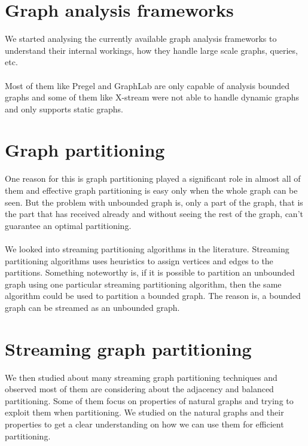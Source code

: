 \documentclass[12pt]{report}
\numberwithin{figure}{section}
\numberwithin{table}{section}
\begin{document}
\section{Graph analysis frameworks}
We started analysing the currently available graph analysis frameworks to understand their internal workings, how they handle large scale graphs, queries, etc.

\paragraph{}

Most of them like Pregel\cite{Pregel} and GraphLab\cite{Graphlab} are only capable of analysis bounded graphs and some of them like X-stream\cite{X-stream} were not able to handle dynamic graphs and only supports static graphs. 

\section{Graph partitioning}
One reason for this is graph partitioning played a significant role in almost all of them and effective graph partitioning is easy only when the whole graph can be seen. But the problem with unbounded graph is, only a part of the graph, that is the part that has received already and without seeing the rest of the graph, can’t guarantee an optimal partitioning.
 
\paragraph{}

We looked into streaming partitioning algorithms in the literature. Streaming partitioning algorithms uses heuristics\cite{Streaming Balanced Graph Partitioning Algorithms1} \cite{Streaming Balanced Graph Partitioning Algorithms2} to assign vertices and edges to the partitions. Something noteworthy is, if it is possible to partition an unbounded graph using one particular streaming partitioning algorithm, then the same algorithm could be used to partition a bounded graph. The reason is, a bounded graph can be streamed as an unbounded graph.
 
\section{Streaming graph partitioning}
We then studied about many streaming graph partitioning techniques and observed most of them are considering about the adjacency and balanced partitioning. Some of them focus on properties of natural graphs and trying to exploit them when partitioning. We studied on the natural graphs and their properties to get a clear understanding on how we can use them for efficient partitioning. 
\end{document}
